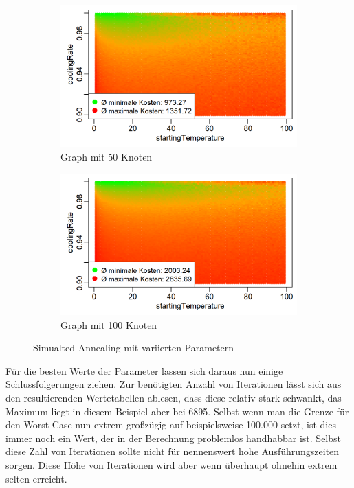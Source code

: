 \begin{figure}[H]
\begin{subfigure}{.495\textwidth}
  \centering
  \includegraphics[width=\linewidth]{images/graphs/tspSimAParameter50.png}
  \caption{Graph mit 50 Knoten}
  \label{fig:esp3}
\end{subfigure}
\begin{subfigure}{.495\textwidth}
  \centering
  \includegraphics[width=\linewidth]{images/graphs/tspSimAParameter100.png}
  \caption{Graph mit 100 Knoten}
  \label{fig:esp4}
\end{subfigure}
\caption{Simualted Annealing mit variierten Parametern}
\label{fig:evalSimAParams}
\end{figure}

Für die besten Werte der Parameter lassen sich daraus nun einige Schlussfolgerungen ziehen. Zur benötigten Anzahl von Iterationen lässt sich aus den resultierenden Wertetabellen ablesen, dass diese relativ stark schwankt, das Maximum liegt in diesem Beispiel aber bei 6895. Selbst wenn man die Grenze für den Worst-Case nun extrem großzügig auf beispielsweise 100.000 setzt, ist dies immer noch ein Wert, der in der Berechnung problemlos handhabbar ist. Selbst diese Zahl von Iterationen sollte nicht für nennenswert hohe Ausführungszeiten sorgen. Diese Höhe von Iterationen wird aber wenn überhaupt ohnehin extrem selten erreicht.

